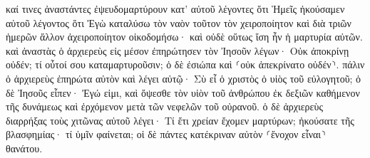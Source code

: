 \documentclass{openreader}
\begin{document}
καί τινες ἀναστάντες ἐψευδομαρτύρουν κατ’ αὐτοῦ λέγοντες 
ὅτι Ἡμεῖς ἠκούσαμεν αὐτοῦ λέγοντος ὅτι Ἐγὼ καταλύσω τὸν ναὸν τοῦτον τὸν χειροποίητον καὶ διὰ τριῶν ἡμερῶν ἄλλον ἀχειροποίητον οἰκοδομήσω· 
καὶ οὐδὲ οὕτως ἴση ἦν ἡ μαρτυρία αὐτῶν. 
καὶ ἀναστὰς ὁ ἀρχιερεὺς εἰς μέσον ἐπηρώτησεν τὸν Ἰησοῦν λέγων· Οὐκ ἀποκρίνῃ οὐδέν; τί οὗτοί σου καταμαρτυροῦσιν; 
ὁ δὲ ἐσιώπα καὶ ⸂οὐκ ἀπεκρίνατο οὐδέν⸃. πάλιν ὁ ἀρχιερεὺς ἐπηρώτα αὐτὸν καὶ λέγει αὐτῷ· Σὺ εἶ ὁ χριστὸς ὁ υἱὸς τοῦ εὐλογητοῦ; 
ὁ δὲ Ἰησοῦς εἶπεν· Ἐγώ εἰμι, καὶ ὄψεσθε τὸν υἱὸν τοῦ ἀνθρώπου ἐκ δεξιῶν καθήμενον τῆς δυνάμεως καὶ ἐρχόμενον μετὰ τῶν νεφελῶν τοῦ οὐρανοῦ. 
ὁ δὲ ἀρχιερεὺς διαρρήξας τοὺς χιτῶνας αὐτοῦ λέγει· Τί ἔτι χρείαν ἔχομεν μαρτύρων; 
ἠκούσατε τῆς βλασφημίας· τί ὑμῖν φαίνεται; οἱ δὲ πάντες κατέκριναν αὐτὸν ⸂ἔνοχον εἶναι⸃ θανάτου. 
\end{document}
